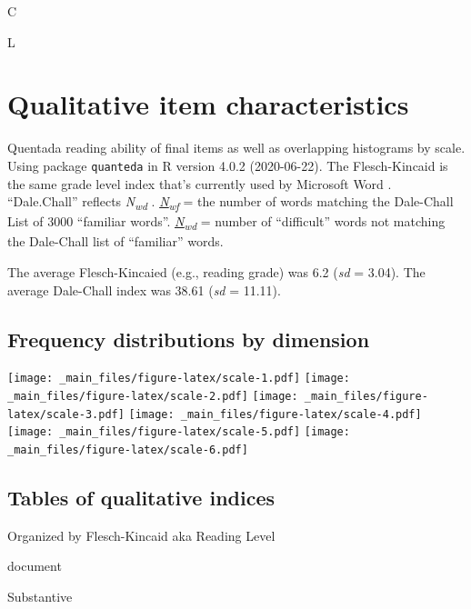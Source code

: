 \documentclass[
]{book}
\begin{document}
C

L

\hypertarget{qualitative-item-characteristics}{%
\chapter{Qualitative item characteristics}\label{qualitative-item-characteristics}}

Quentada reading ability of final items as well as overlapping histograms by scale. Using package \texttt{quanteda} in R version 4.0.2 (2020-06-22). The Flesch-Kincaid is the same grade level index that's currently used by Microsoft Word \citep{kincaid_derivation_1975}. ``Dale.Chall'' reflects \emph{N\textsubscript{wd}} \citep[``difficulty'' of words;][]{chall_dale_1995}. \href{https://quanteda.io/reference/textstat_readability.html}{\emph{N\textsubscript{wf}}} = the number of words matching the Dale-Chall List of 3000 ``familiar words''. \href{https://quanteda.io/reference/textstat_readability.html}{\emph{N\textsubscript{wd}}} = number of ``difficult'' words not matching the Dale-Chall list of ``familiar'' words.

The average Flesch-Kincaied (e.g., reading grade) was 6.2 (\emph{sd} = 3.04). The average Dale-Chall index was 38.61 (\emph{sd} = 11.11).

\hypertarget{frequency-distributions-by-dimension}{%
\section{Frequency distributions by dimension}\label{frequency-distributions-by-dimension}}

\texttt{[image: \_main\_files/figure-latex/scale-1.pdf]} \texttt{[image: \_main\_files/figure-latex/scale-2.pdf]} \texttt{[image: \_main\_files/figure-latex/scale-3.pdf]} \texttt{[image: \_main\_files/figure-latex/scale-4.pdf]} \texttt{[image: \_main\_files/figure-latex/scale-5.pdf]} \texttt{[image: \_main\_files/figure-latex/scale-6.pdf]}

\hypertarget{tables-of-qualitative-indices}{%
\section{Tables of qualitative indices}\label{tables-of-qualitative-indices}}

\label{tab:freqtables}Organized by Flesch-Kincaid aka Reading Level

document

Substantive
\end{document}

